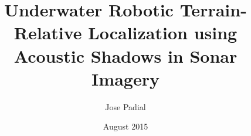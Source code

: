 \documentclass[12pt]{report}
\title{Underwater Robotic Terrain-Relative Localization using Acoustic Shadows in Sonar Imagery}
\author{Jose Padial}
\date{August 2015}
\begin{document}
 
\beforepreface
%
%
\afterpreface

%








\appendix

         

%
\end{document}

